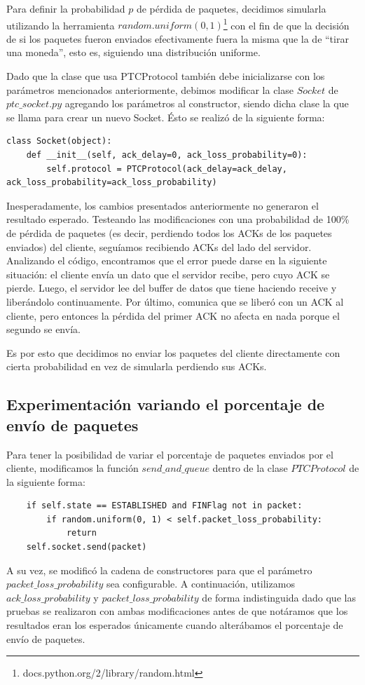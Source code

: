 \documentclass[10pt, a4paper]{article}
\begin{document}
Para definir la probabilidad $p$ de pérdida de paquetes, decidimos simularla utilizando la herramienta $random.uniform(0,1)$\footnote{docs.python.org/2/library/random.html} con el fin de que la decisión de si los paquetes fueron enviados efectivamente fuera la misma que la de ``tirar una moneda'', esto es, siguiendo una distribución uniforme.

Dado que la clase que usa PTCProtocol también debe inicializarse con los parámetros mencionados anteriormente, debimos modificar la clase $Socket$ de $ptc\_socket.py$ agregando los parámetros al constructor, siendo dicha clase la que se llama para crear un nuevo Socket. Ésto se realizó de la siguiente forma:
\begin{verbatim}
class Socket(object):
    def __init__(self, ack_delay=0, ack_loss_probability=0):
		self.protocol = PTCProtocol(ack_delay=ack_delay, ack_loss_probability=ack_loss_probability)
\end{verbatim}

Inesperadamente, los cambios presentados anteriormente no generaron el resultado esperado. Testeando las modificaciones con una probabilidad de 100\% de pérdida de paquetes (es decir, perdiendo todos los ACKs de los paquetes enviados) del cliente, seguíamos recibiendo ACKs del lado del servidor. 
Analizando el código, encontramos que el error puede darse en la siguiente situación: el cliente envía un dato que el servidor recibe, pero cuyo ACK se pierde. Luego, el servidor lee del buffer de datos que tiene haciendo receive y liberándolo continuamente. Por último, comunica que se liberó con un ACK al cliente, pero entonces la pérdida del primer ACK no afecta en nada porque el segundo se envía.

Es por esto que decidimos no enviar los paquetes del cliente directamente con cierta probabilidad en vez de simularla perdiendo sus ACKs.

\subsection{Experimentación variando el porcentaje de envío de paquetes}
Para tener la posibilidad de variar el porcentaje de paquetes enviados por el cliente, modificamos la función $send\_and\_queue$ dentro de la clase $PTCProtocol$ de la siguiente forma:
 
 \begin{verbatim}
  	if self.state == ESTABLISHED and FINFlag not in packet:
		if random.uniform(0, 1) < self.packet_loss_probability:    
			return
	self.socket.send(packet)
 \end{verbatim}
A su vez, se modificó la cadena de constructores para que el parámetro $packet\_loss\_probability$ sea configurable. A continuación, utilizamos $ack\_loss\_probability$ y $packet\_loss\_probability$ de forma indistinguida dado que las pruebas se realizaron con ambas modificaciones antes de que notáramos que los resultados eran los esperados únicamente cuando alterábamos el porcentaje de envío de paquetes. 
\end{document}
